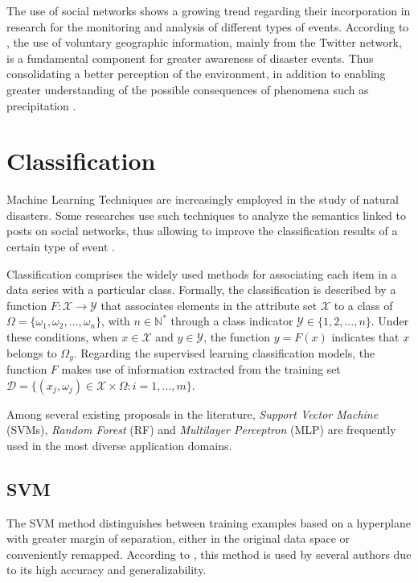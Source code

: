 The use of social networks shows a growing trend regarding their incorporation in research for the monitoring and analysis of different types of events. According to , the use of voluntary geographic information, mainly from the Twitter network, is a fundamental component for greater awareness of disaster events. Thus consolidating a better perception of the environment, in addition to enabling greater understanding of the possible consequences of phenomena such as precipitation \cite{vitorbrasil}.

\section{Classification}\label{class}

Machine Learning Techniques are increasingly employed in the study of natural disasters. Some researches use such techniques to analyze the semantics linked to posts on social networks, thus allowing to improve the classification results of a certain type of event \cite{de2015geographic, deparday2019machine}.

Classification comprises the widely used methods for associating each item in a data series with a particular class. Formally, the classification is described by a function $F: \mathcal{X} \rightarrow \mathcal{Y}$ that associates elements in the attribute set \(\mathcal{X}\) to a class of \(\Omega= \{\omega_1, \omega_2,...,\omega_n\}\), with \(n \in \mathbb{N}^*\) through a class indicator \(\mathcal{Y} \in \{1,2,...,n\}\). Under these conditions, when \(x \in \mathcal{X}\) and \(y \in \mathcal{Y}\), the function \(y=F(x)\) indicates that $x$ belongs to \(\Omega_y\). Regarding the supervised learning classification models, the function \(F\) makes use of information extracted from the training set \(\mathcal{D}=\{(x_j,\omega_j) \in \mathcal{X} \times \Omega : i=1,...,m \}\).

Among several existing proposals in the literature, \textit{Support Vector Machine} (SVMs), \textit{Random Forest} (RF) and \textit{Multilayer Perceptron} (MLP) are frequently used in the most diverse application domains.
\subsection{SVM}

The SVM method distinguishes between training examples based on a hyperplane with greater margin of separation, either in the original data space or conveniently remapped. According to , this method is used by several authors due to its high accuracy and generalizability.


